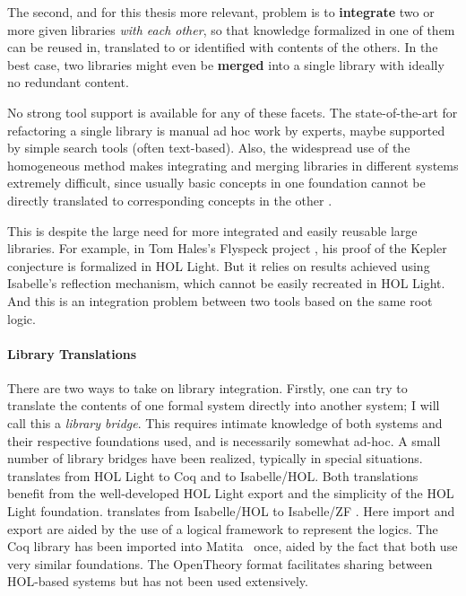 The second, and for this thesis more relevant, problem is to \textbf{integrate} two or more given libraries \emph{with each other}, so that knowledge formalized in one of them can be reused in, translated to or identified with contents of the others. In the best case, two libraries might even be \textbf{merged} into a single library with ideally no redundant content. \medskip

No strong tool support is available for any of these facets.  The state-of-the-art for
refactoring a single library is manual ad hoc work by experts, maybe supported by simple
search tools (often text-based). Also, the widespread use of the homogeneous method makes integrating and merging libraries in different systems extremely difficult, since usually basic concepts in one foundation cannot be directly translated to corresponding concepts in the other \cite{KohRabSac:fvip11}.  

This is despite the large need for more integrated and easily reusable large libraries.
For example, in Tom Hales's Flyspeck project \cite{HalAdaBau:afpkc15}, his proof of the Kepler conjecture is formalized in HOL
Light. But it relies on results achieved using Isabelle's reflection mechanism, which
cannot be easily recreated in HOL Light.  And this is an integration problem
between two tools based on the same root logic.

\paragraph*{Library Translations}

There are two ways to take on library integration. Firstly, one can try to translate the contents of one formal system directly into another system; I will call this a \emph{library bridge}. This requires intimate knowledge of both systems and their respective foundations used, and is necessarily somewhat ad-hoc. 
A small number of library bridges have been realized,
typically in special situations. \cite{hol_coq} translates from HOL Light \cite{hollight}
to Coq \cite{coqmanual} and \cite{hol_isahol} to Isabelle/HOL.  Both translations benefit from
the well-developed HOL Light export and the simplicity of the HOL Light foundation.
\cite{isahol_isazf} translates from Isabelle/HOL \cite{isabellehol} to Isabelle/ZF
\cite{isabelle_zf}.  Here import and export are aided by the use of a logical framework to
represent the logics.  The Coq library has been imported into Matita~\cite{matita} once, aided by the fact
that both use very similar foundations.  The OpenTheory format \cite{opentheory}
facilitates sharing between HOL-based systems but has not been used extensively.

